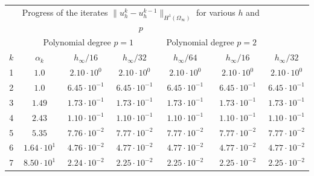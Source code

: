 \documentclass[aspectratio=169,xcolor=dvipsnames,11pt]{beamer}
\begin{document}
\begin{frame}
\begin{table}
\centering
\tiny
\renewcommand{\arraystretch}{1.3}
\begin{tabular}{ |c|c|c|c|c|c|c| }
 \hhline{|>{\arrayrulecolor{white}}-->{\arrayrulecolor{black}}|-----|}
 \multicolumn{2}{c|}{} & \multicolumn{5}{c|}{\cellcolor{lightgray!15} \small\raisebox{5pt}{\vphantom{f}} Progress of the iterates $\|u_h^{k} - u_h^{k-1}\|_{H^1(\Omega_\infty)}$ for various $h$ and $p$}\\[3pt]
 \hhline{|>{\arrayrulecolor{white}}-->{\arrayrulecolor{black}}|-----|}
 \multicolumn{2}{c|}{}& \multicolumn{3}{c|}{\cellcolor{lightgray!05} Polynomial degree $p = 1$} & \multicolumn{2}{c|}{\cellcolor{lightgray!10} Polynomial degree $p = 2$}\\
 \hline
 \rowcolor{lightgray!15}
 $k$ & $\alpha_{k}$ & $h_\infty/16$ & $h_\infty/32$ & $h_\infty/64$ & $h_\infty/16$ & $h_\infty/32$ \\
 \hline
\cellcolor{lightgray!05}   1 & \cellcolor{lightgray!01}   $1.0$              & $2.10\cdot 10^{0}$   & $2.10\cdot 10^{0}$   & $2.10\cdot 10^{0}$   & $2.10\cdot 10^{0}$   & $2.10\cdot 10^{0}$   \\
\cellcolor{lightgray!05}   2 & \cellcolor{lightgray!01}   $1.0$              & $6.45\cdot 10^{-1}$  & $6.45\cdot 10^{-1}$  & $6.45\cdot 10^{-1}$  & $6.45\cdot 10^{-1}$  & $6.45\cdot 10^{-1}$  \\
\cellcolor{lightgray!05}   3 & \cellcolor{lightgray!01}   $1.49$             & $1.73\cdot 10^{-1}$  & $1.73\cdot 10^{-1}$  & $1.73\cdot 10^{-1}$  & $1.73\cdot 10^{-1}$  & $1.73\cdot 10^{-1}$  \\
\cellcolor{lightgray!05}   4 & \cellcolor{lightgray!01}   $2.43$             & $1.10\cdot 10^{-1}$  & $1.10\cdot 10^{-1}$  & $1.10\cdot 10^{-1}$  & $1.10\cdot 10^{-1}$  & $1.10\cdot 10^{-1}$  \\
\cellcolor{lightgray!05}   5 & \cellcolor{lightgray!01}   $5.35$             & $7.76\cdot 10^{-2}$  & $7.77\cdot 10^{-2}$  & $7.77\cdot 10^{-2}$  & $7.77\cdot 10^{-2}$  & $7.77\cdot 10^{-2}$  \\
\cellcolor{lightgray!05}   6 & \cellcolor{lightgray!01}   $1.64\cdot 10^{1}$ & $4.76\cdot 10^{-2}$  & $4.77\cdot 10^{-2}$  & $4.77\cdot 10^{-2}$  & $4.77\cdot 10^{-2}$  & $4.77\cdot 10^{-2}$  \\
\cellcolor{lightgray!05}   7 & \cellcolor{lightgray!01}   $8.50\cdot 10^{1}$ & $2.24\cdot 10^{-2}$  & $2.25\cdot 10^{-2}$  & $2.25\cdot 10^{-2}$  & $2.25\cdot 10^{-2}$  & $2.25\cdot 10^{-2}$  \\

\end{tabular}
\end{table}
\end{frame}
\end{document}
